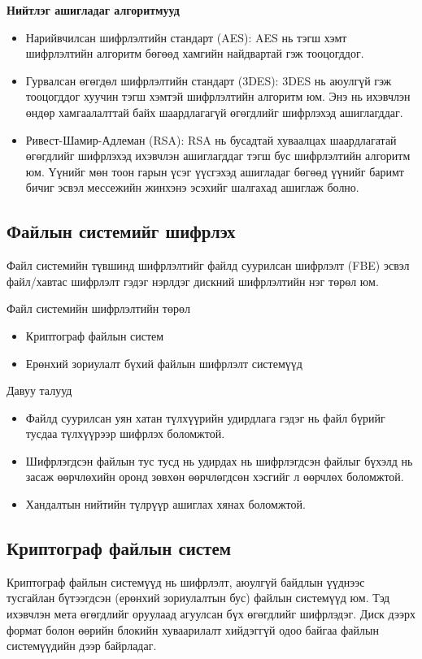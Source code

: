 \textbf{Нийтлэг ашигладаг алгоритмууд}
\begin{itemize}
    \item Нарийвчилсан шифрлэлтийн стандарт (AES): AES нь тэгш хэмт шифрлэлтийн алгоритм бөгөөд хамгийн найдвартай гэж тооцогддог.
    \item Гурвалсан өгөгдөл шифрлэлтийн стандарт (3DES): 3DES нь аюулгүй гэж тооцогддог хуучин тэгш хэмтэй шифрлэлтийн алгоритм юм. Энэ нь ихэвчлэн өндөр хамгаалалттай байх шаардлагагүй өгөгдлийг шифрлэхэд ашиглагддаг.
    \item Ривест-Шамир-Адлеман (RSA): RSA нь бусадтай хуваалцах шаардлагатай өгөгдлийг шифрлэхэд ихэвчлэн ашиглагддаг тэгш бус шифрлэлтийн алгоритм юм. Үүнийг мөн тоон гарын үсэг үүсгэхэд ашигладаг бөгөөд үүнийг баримт бичиг эсвэл мессежийн жинхэнэ эсэхийг шалгахад ашиглаж болно.
\end{itemize}

\subsection*{Файлын системийг шифрлэх}
Файл системийн түвшинд шифрлэлтийг файлд суурилсан шифрлэлт (FBE) эсвэл файл/хавтас шифрлэлт гэдэг нэрлдэг дискний шифрлэлтийн нэг төрөл юм.\cite{WikiEnFileSystem}

Файл системийн шифрлэлтийн төрөл
\begin{itemize}
    \item Криптограф файлын систем
    \item Ерөнхий зориулалт бүхий файлын шифрлэлт системүүд
\end{itemize}

Давуу талууд
\begin{itemize}
    \item Файлд суурилсан уян хатан түлхүүрийн удирдлага гэдэг нь файл бүрийг тусдаа түлхүүрээр шифрлэх боломжтой.
    \item Шифрлэгдсэн файлын тус тусд нь удирдах нь шифрлэгдсэн файлыг бүхэлд нь засаж өөрчлөхийн оронд зөвхөн өөрчлөгдсөн хэсгийг л өөрчлөх боломжтой.
    \item Хандалтын нийтийн түлрүүр ашиглах хянах боломжтой.
\end{itemize}

\subsection*{Криптограф файлын систем}

Криптограф файлын системүүд нь шифрлэлт, аюулгүй байдлын үүднээс тусгайлан бүтээгдсэн (ерөнхий зориулалтын бус) файлын системүүд юм. Тэд ихэвчлэн мета өгөгдлийг оруулаад агуулсан бүх өгөгдлийг шифрлэдэг. Диск дээрх формат болон өөрийн блокийн хуваарилалт хийдэггүй одоо байгаа файлын системүүдийн дээр байрладаг.

